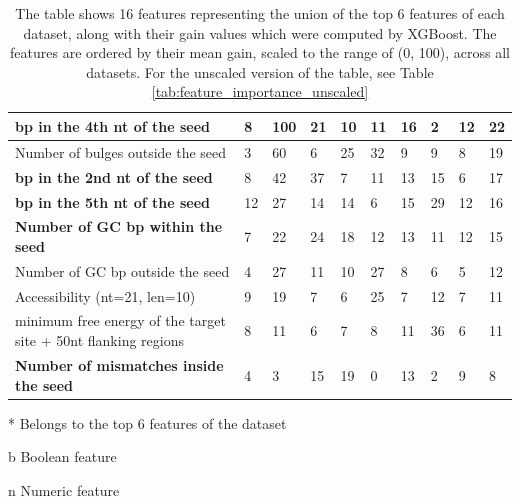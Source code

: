 \begin{table}[h!]
\begin{threeparttable}
{\begin{tabular}{|l|l|l|l|l|l|l|l|l|l|}
\textbf{bp in the 4th nt of the seed\tnote{b}}                    & 8            & 100\tnote{*}          & 21           & 10          & 11          & 16          & 2           & 12          & 22            \\ \hline
Number of bulges outside the seed\tnote{n}                 & 3            & 60\tnote{*}           & 6            & 25\tnote{*}          & 32\tnote{*}          & 9           & 9           & 8           & 19            \\ \hline
\textbf{bp in the 2nd nt of the seed\tnote{b}}                    & 8            & 42           & 37\tnote{*}           & 7           & 11          & 13          & 15          & 6           & 17            \\ \hline
\textbf{bp in the 5th nt of the seed\tnote{b}}                    & 12           & 27           & 14           & 14          & 6           & 15          & 29\tnote{*}          & 12          & 16            \\ \hline
\textbf{Number of GC bp within the seed\tnote{n}}              & 7            & 22           & 24\tnote{*}           & 18\tnote{*}          & 12          & 13          & 11          & 12          & 15            \\ \hline
Number of GC bp outside the seed\tnote{n}                         & 4            & 27           & 11           & 10          & 27\tnote{*}          & 8           & 6           & 5           & 12            \\ \hline
Accessibility (nt=21, len=10)\tnote{n}                                    & 9            & 19           & 7            & 6           & 25          & 7           & 12          & 7           & 11            \\ \hline
minimum free energy of the target site + 50nt flanking regions\tnote{n}            & 8            & 11           & 6            & 7           & 8           & 11          & 36\tnote{*}          & 6           & 11            \\ \hline
\textbf{Number of mismatches inside the seed\tnote{n}}    & 4            & 3            & 15           & 19\tnote{*}          & 0           & 13          & 2           & 9           & 8             \\ \hline
\end{tabular}}
\begin{tablenotes}\footnotesize
\item[*] Belongs to the top 6 features of the dataset
\item[b] Boolean feature
\item[n] Numeric feature

\end{tablenotes}
 \end{threeparttable}
 \caption*{The table shows 16 features representing the union of the top 6 features of each dataset, along with their gain values which were computed by XGBoost. The features are ordered by their mean gain, scaled to the range of (0, 100), across all datasets. For the unscaled version of the table, see Table \ref{tab:feature_importance_unscaled}}
\end{table}


